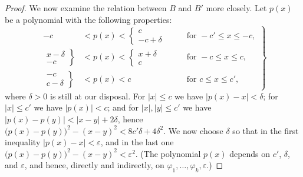 \documentclass[
  paper=b5,
  twoside=true,
  fontsize=13pt,
  headings=normal,
  bookmarkpackage=false
]{scrartcl}
\theoremstyle{definition}
\begin{document}
\begin{proof}
We now examine the relation between \(B\) and \(B'\) more closely. Let
\(p(x)\) be a polynomial with the following properties:
\[
\left.
\begin{alignedat}{2}
  -c
  &<p(x)<\left\{\begin{array}{c}c\\-c+\delta\end{array}\right.
  &\quad&\text{for } -c'\leq x\leq -c,\\
  \left.\begin{array}{c}x-\delta\\-c\end{array}\right\}
  &<p(x)<\left\{\begin{array}{c}x+\delta\\c\end{array}\right.
  &&\text{for } -c\leq x\leq c,\\
  \left.\begin{array}{c}-c\\c-\delta\end{array}\right\}
  &<p(x)<c
  &&\text{for } c\leq x\leq c',
\end{alignedat}
\right\}
\]
where \(\delta>0\) is still at our disposal. For \(\lvert x\rvert\leq c\)
we have \(\lvert p(x)-x\rvert<\delta\); for \(\lvert x\rvert\leq c'\)
we have \(\lvert p(x)\rvert<c\); and for
\(\lvert x\rvert,\lvert y\rvert\leq c'\) we have
\(\lvert p(x)-p(y)\rvert<\lvert x-y\rvert+2\delta\), hence
\(\bigl(p(x)-p(y)\bigr)^2-(x-y)^2<8c'\delta+4\delta^2\).
We now choose \(\delta\) so that in the first inequality
\(\lvert p(x)-x\rvert<\varepsilon\), and in the last one
\(\bigl(p(x)-p(y)\bigr)^2-(x-y)^2<\varepsilon^2\).
(The polynomial \(p(x)\) depends on \(c'\), \(\delta\), and
\(\varepsilon\), and hence, directly and indirectly, on
\(\varphi_1,\ldots,\varphi_k,\varepsilon\).)


\end{proof}
\end{document}
